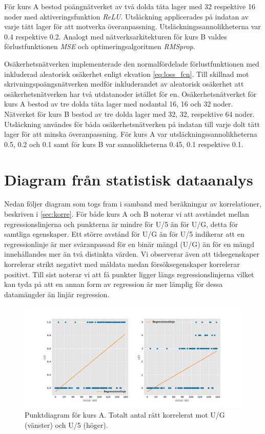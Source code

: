 För kurs A bestod poängnätverket av två dolda täta lager med 32 respektive 16 noder med aktiveringsfunktion \emph{ReLU}. Utsläckning applicerades på indatan av varje tätt lager för att motverka överanpassning. Utsläckningssannolikheterna var 0.4 respektive 0.2. Analogt med nätverksarkitekturen för kurs B valdes förlustfunktionen \emph{MSE} och optimeringsalgoritmen \emph{RMSprop}.

Osäkerhetsnätverken implementerade den normalfördelade förlustfunktionen med inkluderad aleatorisk osäkerhet enligt ekvation \eqref{eq:loss_fcn}. Till skillnad mot skrivningspoängsnätverken medför inkluderandet av aleatorisk osäkerhet att osäkerhetsnätverken har två utdatanoder istället för en. Osäkerhetsnätverket för kurs A bestod av tre dolda täta lager med nodantal 16, 16 och 32 noder. Nätverket för kurs B bestod av tre dolda lager med 32, 32, respektive 64 noder. Utsläckning användes för båda osäkerhetsnätverken på indatan till varje dolt tätt lager för att minska överanpassning. För kurs A var utsläckningssannolikheterna 0.5, 0.2 och 0.1 samt för kurs B var sannolikheterna 0.45, 0.1 respektive 0.1.

\section{Diagram från statistisk dataanalys}
\label{app:diag}
Nedan följer diagram som togs fram i samband med beräkningar av korrelationer, beskriven i \ref{sec:korre}. För både kurs A och B noterar vi att avståndet mellan regressionslinjerna och punkterna är mindre för U/5 än för U/G, detta för samtliga egenskaper. Ett större avstånd för U/G än för U/5 indikerar att en regressionlinje är mer svåranpassad för en binär mängd (U/G) än för en mängd innehållandes mer än två distinkta värden. Vi observerar även att tidsegenskaper korrelerar strikt negativt med måldata medan försöksegenskaper korrelerar positivt. Till sist noterar vi att få punkter ligger längs regressionslinjerna vilket kan tyda på att en annan form av regression är mer lämplig för dessa datamängder än linjär regression.

\begin{figure}[hbtp]
    \centering
    \includegraphics[width=1\textwidth]{images/pktdiagram/mekEg0.png}
    \caption{Punktdiagram för kurs A. Totalt antal rätt korrelerat mot U/G (vänster) och U/5 (höger).}
    \label{fig:pktdigA1}
\end{figure}

